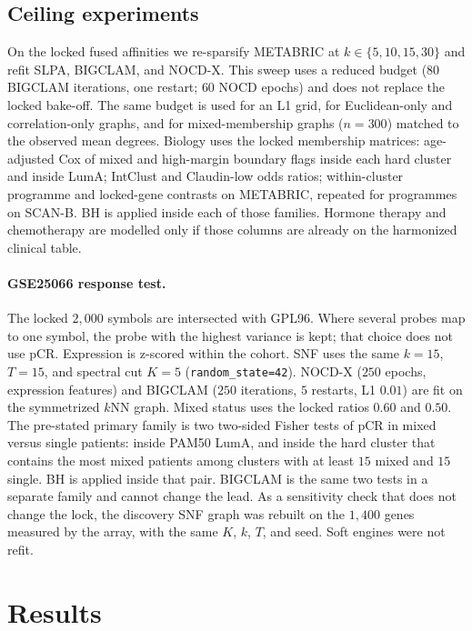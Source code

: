\documentclass[11pt,a4paper]{article}
\begin{document}
\subsection{Ceiling experiments}
On the locked fused affinities we re-sparsify METABRIC at $k\in\{5,10,15,30\}$ and refit SLPA, BIGCLAM, and NOCD-X. This sweep uses a reduced budget ($80$ BIGCLAM iterations, one restart; $60$ NOCD epochs) and does not replace the locked bake-off. The same budget is used for an L1 grid, for Euclidean-only and correlation-only graphs, and for mixed-membership graphs ($n=300$) matched to the observed mean degrees. Biology uses the locked membership matrices: age-adjusted Cox of mixed and high-margin boundary flags inside each hard cluster and inside LumA; IntClust and Claudin-low odds ratios; within-cluster programme and locked-gene contrasts on METABRIC, repeated for programmes on SCAN-B. BH is applied inside each of those families. Hormone therapy and chemotherapy are modelled only if those columns are already on the harmonized clinical table.

\paragraph{GSE25066 response test.}
The locked $2{,}000$ symbols are intersected with GPL96. Where several probes map to one symbol, the probe with the highest variance is kept; that choice does not use pCR. Expression is z-scored within the cohort. SNF uses the same $k=15$, $T=15$, and spectral cut $K=5$ (\texttt{random\_state=42}). NOCD-X ($250$ epochs, expression features) and BIGCLAM ($250$ iterations, $5$ restarts, L1 $0.01$) are fit on the symmetrized $k$NN graph. Mixed status uses the locked ratios $0.60$ and $0.50$. The pre-stated primary family is two two-sided Fisher tests of pCR in mixed versus single patients: inside PAM50 LumA, and inside the hard cluster that contains the most mixed patients among clusters with at least $15$ mixed and $15$ single. BH is applied inside that pair. BIGCLAM is the same two tests in a separate family and cannot change the lead. As a sensitivity check that does not change the lock, the discovery SNF graph was rebuilt on the $1{,}400$ genes measured by the array, with the same $K$, $k$, $T$, and seed. Soft engines were not refit.

\section{Results}
\end{document}
